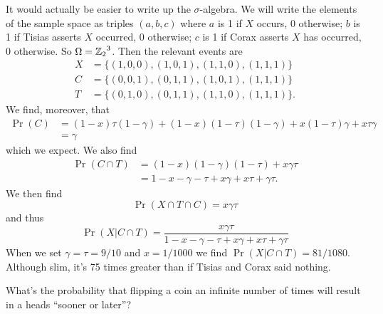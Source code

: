 It would actually be easier to write up the $\sigma$-algebra. We will
write the elements of the sample space as triples $(a,b,c)$ where $a$ is
1 if $X$ occurs, 0 otherwise; $b$ is 1 if Tisias asserts $X$ occurred, 0
otherwise; $c$ is 1 if Corax asserts $X$ has occurred, 0 otherwise. So
$\Omega={\mathbb{Z}_{2}}^{3}$. Then the relevant events are
\begin{subequations}
\begin{align}
X&=\{(1,0,0),(1,0,1),(1,1,0),(1,1,1)\}\\
C&=\{(0,0,1),(0,1,1),(1,0,1),(1,1,1)\}\\
T&=\{(0,1,0),(0,1,1),(1,1,0),(1,1,1)\}.
\end{align}
\end{subequations}
We find, moreover, that
\begin{equation}
\begin{split}
\Pr(C)&=(1-x)\tau(1-\gamma)+(1-x)(1-\tau)(1-\gamma)+x(1-\tau)\gamma+x\tau\gamma\\
&=\gamma
\end{split}
\end{equation}
which we expect. We also find
\begin{equation}
\begin{split}
\Pr(C\cap T)&=(1-x)(1-\gamma)(1-\tau)+x\gamma\tau\\
&=1-x-\gamma-\tau+x\gamma+x\tau+\gamma\tau.
\end{split}
\end{equation}
We then find
\begin{equation}
\Pr(X\cap T\cap C)=x\gamma\tau
\end{equation}
and thus
\begin{equation}
\Pr(X|C\cap T)=\frac{x\gamma\tau}{1-x-\gamma-\tau+x\gamma+x\tau+\gamma\tau}
\end{equation}
When we set $\gamma=\tau=9/10$ and $x=1/1000$ we find $\Pr(X|C\cap
T)=81/1080$. Although slim, it's 75 times greater than if Tisias and
Corax said nothing.


What's the probability that flipping a coin an infinite number of times
will result in a heads ``sooner or later''?

